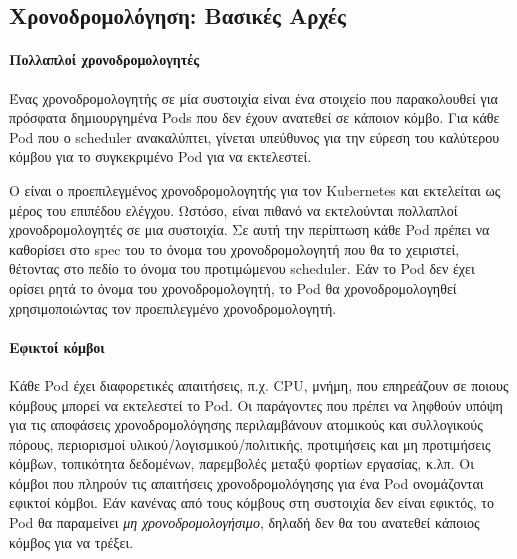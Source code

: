 \subsection{Χρονοδρομολόγηση: Βασικές Αρχές}
\label{section:gr-scheduling-fundamentals}

\paragraph*{Πολλαπλοί χρονοδρομολογητές}
Ένας χρονοδρομολογητής σε μία συστοιχία  είναι ένα στοιχείο που
παρακολουθεί για πρόσφατα δημιουργημένα Pods που δεν έχουν ανατεθεί σε κάποιον
κόμβο. Για κάθε Pod που ο scheduler ανακαλύπτει, γίνεται υπεύθυνος για την
εύρεση του καλύτερου κόμβου για το συγκεκριμένο Pod για να εκτελεστεί.

Ο  είναι ο προεπιλεγμένος χρονοδρομολογητής για τον
Kubernetes και εκτελείται ως μέρος του επιπέδου ελέγχου. Ωστόσο, είναι πιθανό να
εκτελούνται πολλαπλοί χρονοδρομολογητές σε μια συστοιχία. Σε αυτή την περίπτωση
κάθε Pod πρέπει να καθορίσει στο spec του το όνομα του χρονοδρομολογητή που θα
το χειριστεί, θέτοντας στο πεδίο  το όνομα του
προτιμώμενου scheduler. Εάν το Pod δεν έχει ορίσει ρητά το όνομα του
χρονοδρομολογητή, το Pod θα χρονοδρομολογηθεί χρησιμοποιώντας τον προεπιλεγμένο
χρονοδρομολογητή.

\paragraph*{Εφικτοί κόμβοι} Κάθε Pod έχει διαφορετικές απαιτήσεις, π.χ. CPU,
μνήμη, που επηρεάζουν σε ποιους κόμβους μπορεί να εκτελεστεί το Pod. Οι
παράγοντες που πρέπει να ληφθούν υπόψη για τις αποφάσεις χρονοδρομολόγησης
περιλαμβάνουν ατομικούς και συλλογικούς πόρους, περιορισμοί
υλικού/λογισμικού/πολιτικής, προτιμήσεις και μη προτιμήσεις κόμβων, τοπικότητα
δεδομένων, παρεμβολές μεταξύ φορτίων εργασίας, κ.λπ. Οι κόμβοι που πληρούν τις
απαιτήσεις χρονοδρομολόγησης για ένα Pod ονομάζονται \textit{}{εφικτοί} κόμβοι.
Εάν κανένας από τους κόμβους στη συστοιχία δεν είναι εφικτός, το Pod θα
παραμείνει \textit{μη χρονοδρομολογήσιμο}, δηλαδή δεν θα του ανατεθεί κάποιος
κόμβος για να τρέξει.

